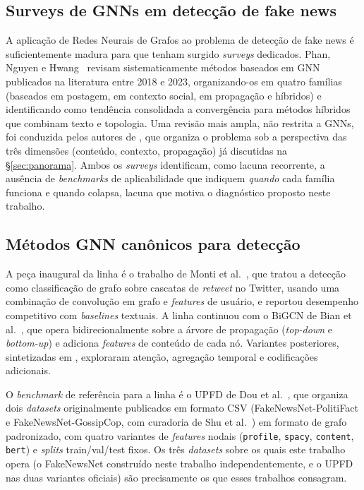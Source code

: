 \subsection{Surveys de GNNs em detec\c{c}\~ao de fake news}
\label{sec:surveys}

A aplica\c{c}\~ao de Redes Neurais de Grafos ao problema de detec\c{c}\~ao
de fake news \'e suficientemente madura para que tenham surgido
\emph{surveys} dedicados. Phan, Nguyen e Hwang~\cite{pmc_gnnsurveyfakenews}
revisam sistematicamente m\'etodos baseados em GNN publicados na
literatura entre 2018 e 2023, organizando-os em quatro fam\'ilias
(baseados em postagem, em contexto social, em propaga\c{c}\~ao e
h\'ibridos) e identificando como tend\^encia consolidada a converg\^encia
para m\'etodos h\'ibridos que combinam texto e topologia. Uma revis\~ao
mais ampla, n\~ao restrita a GNNs, foi conduzida pelos autores de
\cite{pmc_overviewfakenews}, que organiza o problema sob a perspectiva
das tr\^es dimens\~oes (conte\'udo, contexto, propaga\c{c}\~ao) j\'a
discutidas na \S\ref{sec:panorama}. Ambos os \emph{surveys}
identificam, como lacuna recorrente, a aus\^encia de \emph{benchmarks}
de aplicabilidade que indiquem \emph{quando} cada fam\'ilia funciona
e quando colapsa, lacuna que motiva o diagn\'ostico proposto neste
trabalho.

\subsection{M\'etodos GNN can\^onicos para detec\c{c}\~ao}
\label{sec:metodos_canonicos}

A pe\c{c}a inaugural da linha \'e o trabalho de Monti et
al.~\cite{monti2019fakenews}, que tratou a detec\c{c}\~ao como
classifica\c{c}\~ao de grafo sobre cascatas de \emph{retweet} no
Twitter, usando uma combina\c{c}\~ao de convolu\c{c}\~ao em grafo e
\emph{features} de usu\'ario, e reportou desempenho competitivo com
\emph{baselines} textuais. A linha continuou com o BiGCN de Bian et
al.~\cite{bian2020bigcn}, que opera bidirecionalmente sobre a \'arvore
de propaga\c{c}\~ao (\emph{top-down} e \emph{bottom-up}) e adiciona
\emph{features} de conte\'udo de cada n\'o. Variantes posteriores,
sintetizadas em \cite{mdpi_bidirectionalgcn}, exploraram
aten\c{c}\~ao, agrega\c{c}\~ao temporal e codifica\c{c}\~oes adicionais.

O \emph{benchmark} de refer\^encia para a linha \'e o UPFD de Dou et
al.~\cite{dou2021upfd}, que organiza dois \emph{datasets} originalmente
publicados em formato CSV (FakeNewsNet-PolitiFact e
FakeNewsNet-GossipCop, com curadoria de Shu et al.~\cite{shu2020fakenewsnet})
em formato de grafo padronizado, com quatro variantes de
\emph{features} nodais (\texttt{profile}, \texttt{spacy},
\texttt{content}, \texttt{bert}) e \emph{splits} train/val/test fixos.
Os tr\^es \emph{datasets} sobre os quais este trabalho opera (o
FakeNewsNet constru\'ido neste trabalho independentemente, e o UPFD nas duas
variantes oficiais) s\~ao precisamente os que esses trabalhos
consagram.

